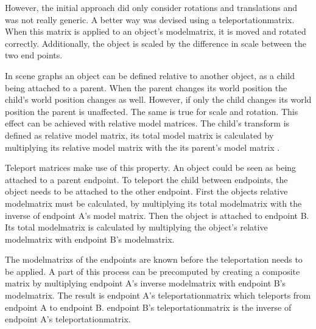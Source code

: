However, the initial approach did only consider rotations and translations and was not really generic. A better way was devised using a \gls{teleportationmatrix}. When this matrix is applied to an object's \gls{modelmatrix}, it is moved and rotated correctly. Additionally, the object is scaled by the difference in scale between the two end points.




In scene graphs an object can be defined relative to another object, as a child being attached to a parent. When the parent changes its world position the child's world position changes as well. However, if only the child changes its world position the parent is unaffected. The same is true for scale and rotation. This effect can be achieved with relative model matrices. The child's transform is defined as relative model matrix, its total model matrix is calculated by multiplying its relative model matrix with the its parent's model matrix \cite{akine:2018:realtime}.

Teleport matrices make use of this property. An object could be seen as being attached to a parent \gls{endpoint}. To teleport the child between endpoints, the object needs to be attached to the other endpoint. First the objects relative \gls{modelmatrix} must be calculated, by multiplying its total \gls{modelmatrix} with the inverse of \gls{endpoint} A's model matrix. Then the object is attached to \gls{endpoint} B. Its total \gls{modelmatrix} is calculated by multiplying the object's relative \gls{modelmatrix} with \gls{endpoint} B's \gls{modelmatrix}.

The \glspl{modelmatrix} of the endpoints are known before the teleportation needs to be applied. A part of this process can be precomputed by creating a composite matrix by multiplying \gls{endpoint} A's inverse \gls{modelmatrix} with \gls{endpoint} B's \gls{modelmatrix}. The result is \gls{endpoint} A's \gls{teleportationmatrix} which teleports from \gls{endpoint} A to \gls{endpoint} B. \Gls{endpoint} B's \gls{teleportationmatrix} is the inverse of \gls{endpoint} A's \gls{teleportationmatrix}.



